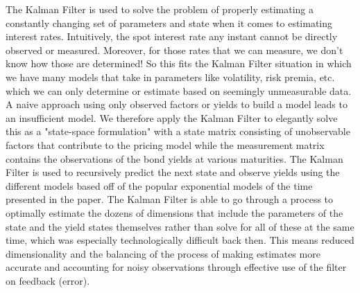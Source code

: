 \documentclass{article}
\begin{document}
{The Kalman Filter is used to solve the problem of properly estimating a constantly changing set of parameters and state when it comes to estimating interest rates. Intuitively, the spot interest rate any instant cannot be directly observed or measured. Moreover, for those rates that we can measure, we don't know how those are determined! So this fits the Kalman Filter situation in which we have many models that take in parameters like volatility, risk premia, etc. which we can only determine or estimate based on seemingly unmeasurable data. A naive approach using only observed factors or yields to build a model leads to an insufficient model. We therefore apply the Kalman Filter to elegantly solve this as a "state-space formulation" with a state matrix consisting of unobservable factors that contribute to the pricing model while the measurement matrix contains the observations of the bond yields at various maturities. The Kalman Filter is used to recursively predict the next state and observe yields using the different models based off of the popular exponential models of the time presented in the paper. The Kalman Filter is able to go through a process to optimally estimate the dozens of dimensions that include the parameters of the state and the yield states themselves rather than solve for all of these at the same time, which was especially technologically difficult back then. This means reduced dimensionality and the balancing of the process of making estimates more accurate and accounting for noisy observations through effective use of the filter on feedback (error).


}
\end{document}
